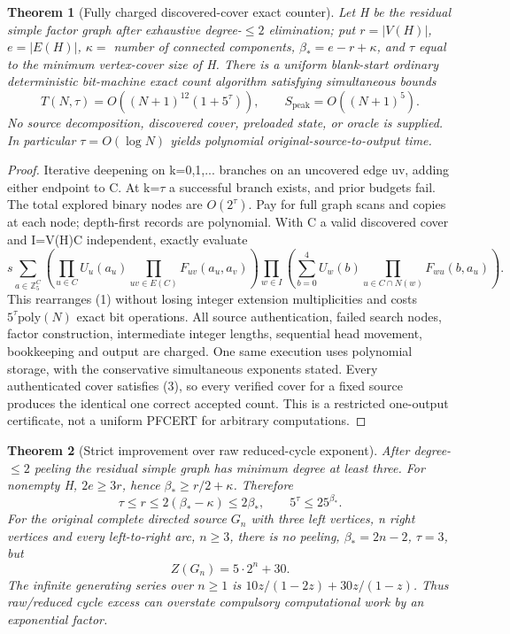 \documentclass[11pt]{article}
\newtheorem{theorem}{Theorem}
\begin{document}
\begin{theorem}[Fully charged discovered-cover exact counter]
Let H be the residual simple factor graph after exhaustive degree-$\le2$ elimination; put $r=|V(H)|$, $e=|E(H)|$, $\kappa=$ number of connected components, $\beta_*=e-r+\kappa$, and $\tau$ equal to the \emph{minimum} vertex-cover size of H. There is a uniform blank-start ordinary deterministic bit-machine exact count algorithm satisfying simultaneous bounds
\[
\boxed{T(N,\tau)=O((N+1)^{12}(1+5^\tau)),\qquad S_{\mathrm{peak}}=O((N+1)^5).}
\]
No source decomposition, discovered cover, preloaded state, or oracle is supplied. In particular $\tau=O(\log N)$ yields polynomial original-source-to-output time.
\end{theorem}
\begin{proof}
Iterative deepening on k=0,1,... branches on an uncovered edge uv, adding either endpoint to C. At k=$\tau$ a successful branch exists, and prior budgets fail. The total explored binary nodes are $O(2^\tau)$. Pay for full graph scans and copies at each node; depth-first records are polynomial.
With C a valid discovered cover and I=V(H)\setminus C independent, exactly evaluate
\[
s\sum_{a\in\mathbb Z_5^C}
 \left(\prod_{u\in C}U_u(a_u)\prod_{uv\in E(C)}F_{uv}(a_u,a_v)\right)
 \prod_{w\in I}\left(\sum_{b=0}^4U_w(b)\prod_{u\in C\cap N(w)}F_{wu}(b,a_u)\right).
\tag{3}
\]
This rearranges (1) without losing integer extension multiplicities and costs $5^\tau\mathrm{poly}(N)$ exact bit operations. All source authentication, failed search nodes, factor construction, intermediate integer lengths, sequential head movement, bookkeeping and output are charged. One same execution uses polynomial storage, with the conservative simultaneous exponents stated. Every authenticated cover satisfies (3), so every verified cover for a fixed source produces the identical one correct accepted count. This is a restricted one-output certificate, not a uniform PFCERT for arbitrary computations.
\end{proof}
\begin{theorem}[Strict improvement over raw reduced-cycle exponent]
After degree-$\le2$ peeling the residual simple graph has minimum degree at least three. For nonempty H, $2e\ge3r$, hence $\beta_*\ge r/2+\kappa$. Therefore
\[
\tau\le r\le2(\beta_*-\kappa)\le2\beta_*,\qquad 5^\tau\le25^{\beta_*}.
\]
For the original complete directed source $G_n$ with three left vertices, n right vertices and every left-to-right arc, $n\ge3$, there is no peeling, $\beta_*=2n-2$, $\tau=3$, but
\[
\boxed{Z(G_n)=5\cdot 2^n+30}.
\]
The infinite generating series over $n\ge1$ is $10z/(1-2z)+30z/(1-z)$. Thus raw/reduced cycle excess can overstate compulsory computational work by an exponential factor.
\end{theorem}
\end{document}

